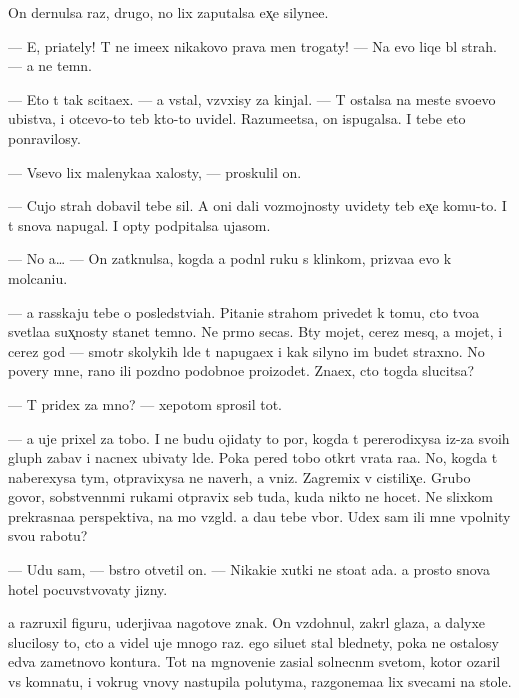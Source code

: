 \documentclass[10pt]{book}
\begin{document}
On dernulsa raz, drugo{\y}, no lix zaputalsa {\y}ex̨e silyne{\y}e.

— E{\y}, pri{\y}ately! T{\yi} ne ime{\y}ex nikakovo prava men{\ia} trogaty! — Na {\y}evo liqe b{\yi}l strah. — {\Y}a ne temn{\yi}{\y}.

— Eto t{\yi} tak scita{\y}ex. — {\Y}a vstal, vz{\ia}vxisy za kinjal. — T{\yi} ostalsa na meste svo{\y}evo ubi{\y}stva, i otcevo-to teb{\ia} kto-to uvidel. Razume{\y}etsa, on ispugalsa. I tebe eto ponravilosy.

— Vsevo lix malenyka{\y}a xalosty, — proskulil on.

— Cujo{\y} strah dobavil tebe sil. A oni dali vozmojnosty uvidety teb{\ia} {\y}ex̨e komu-to. I t{\yi} snova napugal. I op{\ia}ty podpitalsa ujasom.

— No {\y}a… — On zatknulsa, kogda {\y}a podn{\ia}l ruku s klinkom, priz{\yi}va{\y}a {\y}evo k molcani{\y}u.

— {\Y}a rasskaju tebe o posledstvi{\y}ah. Pitani{\y}e strahom privedet k tomu, cto tvo{\y}a svetla{\y}a sux̨nosty stanet temno{\y}. Ne pr{\ia}mo se{\y}cas. B{\yi}ty mojet, cerez mes{\ia}q, a mojet, i cerez god — smotr{\ia} skolykih l{\iu}de{\y} t{\yi} napuga{\y}ex i kak silyno im budet straxno. No povery mne, rano ili pozdno podobno{\y}e pro{\y}izo{\y}det. Zna{\y}ex, cto togda slucitsa?

— T{\yi} pridex za mno{\y}? — xepotom sprosil tot.

— {\Y}a uje prixel za tobo{\y}. I ne budu ojidaty to{\y} por{\yi}, kogda t{\yi} pererodixysa iz-za svo{\y}ih glup{\yi}h zabav i nacnex ubivaty l{\iu}de{\y}. Poka pered tobo{\y} otkr{\yi}t{\yi} vrata ra{\y}a. No, kogda t{\yi} naberexysa tym{\yi}, otpravixysa ne naverh, a vniz. Zagremix v cistilix̨e. Grubo govor{\ia}, sobstvenn{\yi}mi rukami otpravix seb{\ia} tuda, kuda nikto ne hocet. Ne slixkom prekrasna{\y}a perspektiva, na mo{\y} vzgl{\ia}d. {\Y}a da{\y}u tebe v{\yi}bor. U{\y}dex sam ili mne v{\yi}polnity svo{\y}u rabotu?

— U{\y}du sam, — b{\yi}stro otvetil on. — Nikaki{\y}e xutki ne sto{\y}at ada. {\Y}a prosto snova hotel pocuvstvovaty jizny.

{\Y}a razruxil figuru, uderjiva{\y}a nagotove znak. On vzdohnul, zakr{\yi}l glaza, a dalyxe slucilosy to, cto {\y}a videl uje mnogo raz. {\Y}ego siluet stal blednety, poka ne ostalosy {\y}edva zametnovo kontura. Tot na mgnoveni{\y}e zasi{\y}al solnecn{\yi}m svetom, kotor{\yi}{\y} ozaril vs{\iu} komnatu, i vokrug vnovy nastupila polutyma, razgon{\ia}{\y}ema{\y}a lix svecami na stole.
\end{document}
